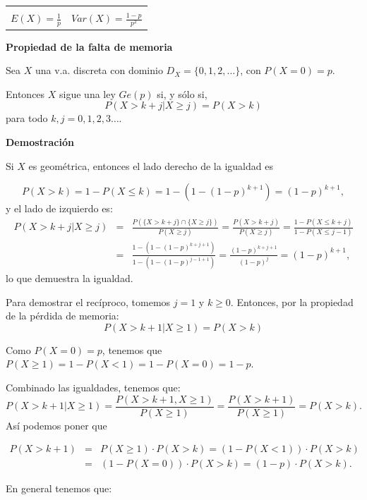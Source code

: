 \documentclass[]{book}
\begin{document}
\begin{longtable}[]{@{}rl@{}}
\begin{minipage}[t]{0.43\columnwidth}
\end{minipage}\tabularnewline
\begin{minipage}[t]{0.51\columnwidth}\raggedleft
\(E(X)=\frac1{p}\)\strut
\end{minipage} & \begin{minipage}[t]{0.43\columnwidth}\raggedright
\(Var(X)=\frac{1-p}{p^2}\)\strut
\end{minipage}\tabularnewline
\bottomrule
\end{longtable}

\textbf{Propiedad de la falta de memoria}

Sea \(X\) una v.a. discreta con dominio \(D_X=\{0,1,2,\ldots\}\), con \(P(X=0)=p\).

Entonces \(X\) sigue una ley \(Ge(p)\) si, y sólo si,
\[
P\left(X> k+j\big| X\geq j\right)=P(X> k)
\]
para todo \(k,j=0,1,2,3\ldots\).

\textbf{Demostración}

Si \(X\) es geométrica, entonces el lado derecho de la igualdad es

\[
P(X>k)=1-P(X\leq k)=1-\left(1-(1-p)^{k+1}\right)=(1-p)^{k+1},
\]
y el lado de izquierdo es:
\[
\begin{array}{rll} 
P\left(X> k+j\big| X\geq j\right)&=&\frac{P\left(\{X> k+j\}\cap \{X\geq j\} \right)}{P\left(X\geq j\right)}=
\frac{P\left(X>k+j \right)}{P\left(X\geq j \right)} = \frac{1-P(X\leq k+j)}{1-P(X\leq j-1)}\\
&=&  \frac{1-(1-(1-p)^{k+j+1})}{1-(1-(1-p)^{j-1+1})} =\frac{(1-p)^{k+j+1}}{(1-p)^{j}} = (1-p)^{k+1},
\end{array}
\]
lo que demuestra la igualdad.

Para demostrar el recíproco, tomemos \(j=1\) y \(k\geq 0\). Entonces, por la propiedad de la pérdida de memoria:
\[
P\left(X> k+1\big| X\geq 1\right)=P(X> k)
\]

Como \(P(X=0)=p\), tenemos que \(P(X \geq 1 )=1-P(X<1)=1-P(X=0)=1-p\).

Combinado las igualdades, tenemos que:
\[
P\left(X> k+1\big| X\geq 1\right)=\frac{P(X>k+1, X\geq 1)}{P(X\geq 1)}=\frac{P(X>k+1)}{P(X\geq 1)}=P(X>k).
\]
Así podemos poner que

\[
\begin{array}{rll}
P(X>k+1)&=&P(X\geq 1)\cdot P(X>k)=\left(1-P(X<1)\right)\cdot P(X>k)\\
&=&\left(1-P(X=0)\right)\cdot P(X>k)=(1-p)\cdot P(X>k).
\end{array}
\]

En general tenemos que:
\end{document}
